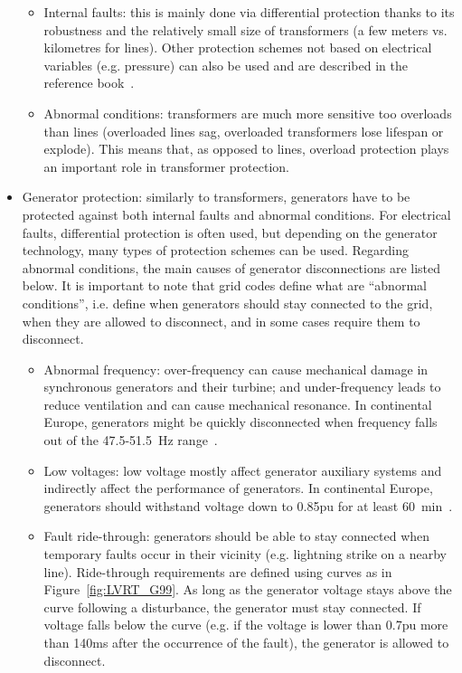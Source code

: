\begin{itemize}
    \begin{itemize}
        \item Internal faults: this is mainly done via differential protection thanks to its robustness and the relatively small size of transformers (a few meters vs. kilometres for lines). Other protection schemes not based on electrical variables (e.g. pressure) can also be used and are described in the reference book~\cite{HorowitzBook}.
        \item Abnormal conditions: transformers are much more sensitive too overloads than lines (overloaded lines sag, overloaded transformers lose lifespan or explode). This means that, as opposed to lines, overload protection plays an important role in transformer protection.
    \end{itemize}
    \item Generator protection: similarly to transformers, generators have to be protected against both internal faults and abnormal conditions. For electrical faults, differential protection is often used, but depending on the generator technology, many types of protection schemes can be used. Regarding abnormal conditions, the main causes of generator disconnections are listed below. It is important to note that grid codes define what are ``abnormal conditions'', i.e. define when generators should stay connected to the grid, when they are allowed to disconnect, and in some cases require them to disconnect.
    \begin{itemize}
        \item Abnormal frequency: over-frequency can cause mechanical damage in synchronous generators and their turbine; and under-frequency leads to reduce ventilation and can cause mechanical resonance. In continental Europe, generators might be quickly disconnected when frequency falls out of the 47.5-51.5~Hz range~\cite{ENTSOEgeneratorRequirements}.
        \item Low voltages: low voltage mostly affect generator auxiliary systems and indirectly affect the performance of generators. In continental Europe, generators should withstand voltage down to 0.85pu for at least 60~min~\cite{ENTSOEgeneratorRequirements}.
        \item Fault ride-through: generators should be able to stay connected when temporary faults occur in their vicinity (e.g. lightning strike on a nearby line). Ride-through requirements are defined using curves as in Figure~\ref{fig:LVRT_G99}. As long as the generator voltage stays above the curve following a disturbance, the generator must stay connected. If voltage falls below the curve (e.g. if the voltage is lower than 0.7pu more than 140ms after the occurrence of the fault), the generator is allowed to disconnect.

\end{itemize}
\end{itemize}
